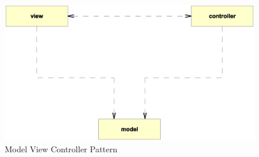\begin{figure}[ht]
    \begin{center}
        \includegraphics[scale=0.3]{vector/mvc.eps}
        \caption{Model View Controller Pattern}
        \label{mvc_figure}
    \end{center}
\end{figure}
